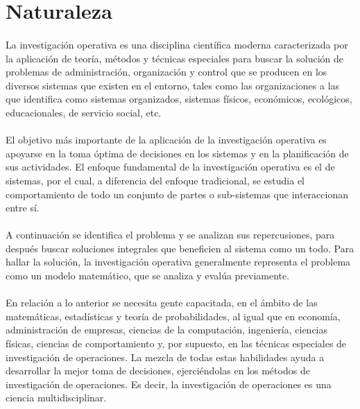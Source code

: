 \documentclass[12pt, a4paper,spanish]{article}
\begin{document}
	\section{Naturaleza}
		\paragraph{}
		La investigación operativa es una disciplina científica moderna caracterizada por la aplicación de teoría, métodos y técnicas especiales para buscar la solución de problemas de administración, organización y control que se producen en los diversos sistemas que existen en el entorno, tales como las organizaciones a las que identifica como sistemas organizados, sistemas físicos, económicos, ecológicos, educacionales, de servicio social, etc. \cite{wikipedia_IO}

		\paragraph{}
		El objetivo más importante de la aplicación de la investigación operativa es apoyarse en la toma óptima de decisiones en los sistemas y en la planificación de sus actividades. El enfoque fundamental de la investigación operativa es el de sistemas, por el cual, a diferencia del enfoque tradicional, se estudia el comportamiento de todo un conjunto de partes o sub-sistemas que interaccionan entre sí. \cite{wikipedia_IO}

		\paragraph{}
		A continuación se identifica el problema y se analizan sus repercusiones, para después buscar soluciones integrales que beneficien al sistema como un todo. Para hallar la solución, la investigación operativa generalmente representa el problema como un modelo matemático, que se analiza y evalúa previamente. \cite{wikipedia_IO}

		\paragraph{}
		En relación a lo anterior se necesita gente capacitada, en el ámbito de las matemáticas, estadísticas y teoría de probabilidades, al igual que en economía, administración de empresas, ciencias de la computación, ingeniería, ciencias físicas, ciencias de comportamiento y, por supuesto, en las técnicas especiales de investigación de operaciones. La mezcla de todas estas habilidades ayuda a desarrollar la mejor toma de decisiones, ejerciéndolas en los métodos de investigación de operaciones. Es decir, la investigación de operaciones es una ciencia multidisciplinar. \cite{gestiopolis_IO}
\end{document}
